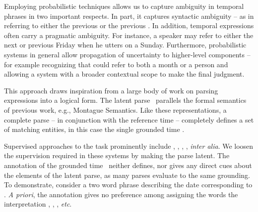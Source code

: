 Employing probabilistic techniques allows us to capture ambiguity in temporal 
	phrases in two important respects.
In part, it captures syntactic ambiguity -- as in  referring to either the previous  or the previous
	.
In addition, temporal expressions often carry a pragmatic ambiguity.
For instance, a speaker may refer to either the next or previous Friday
	when he utters  on a Sunday.
Furthermore, probabilistic systems in general allow propagation of uncertainty
	to higher-level components -- for example recognizing that  could
	refer to both a month or a person and allowing a system with a broader
	contextual scope to make the final judgment.



This approach draws inspiration from a large body of work
	on parsing expressions into a logical form.
The latent parse \latent\ parallels the formal semantics of previous work,
	e.g., Montague Semantics.
Like these representations, a complete parse -- in conjunction with
	the reference time -- completely defines a set of
	matching entities, in this case the single grounded time \grounded.

Supervised approaches to the task prominently include
	,
	, 
	,
	, 
	\textit{inter alia}.
We loosen the supervision required in these systems by making the
	parse latent.
The annotation of the grounded time \grounded\ neither defines, nor gives any
	direct cues about the elements of the latent parse, as many parses evaluate
	to the same grounding.
To demonstrate, consider a two word phrase describing the date corresponding to
	.
\textit{A priori}, the annotation gives no preference among assigning the
	words the interpretation , ,
	\te{[month] [day]}, \textit{etc}.


